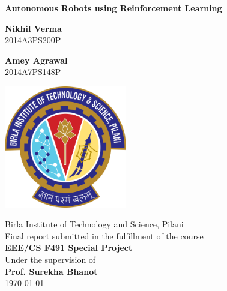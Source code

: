 \documentclass[12pt]{extreport}
\theoremstyle{plain}
\theoremstyle{definition}
\begin{document}
\begin{titlepage}
 \begin{center}

  \vspace*{1cm}

  \begin{huge}
   \textbf{Autonomous Robots using Reinforcement Learning}
  \end{huge}

  \vspace{0.5cm}

  \begin{multicols}{2}
   \textbf{Nikhil Verma}\\
   2014A3PS200P

   \textbf{Amey Agrawal}\\
   2014A7PS148P
  \end{multicols}

  \vspace{2cm}

  \includegraphics[width=0.4\textwidth]{logo}

  \vspace{2cm}

  Birla Institute of Technology and Science, Pilani\\
  \vspace{0.5cm}
  Final report submitted in the fulfillment of the course\\
  \textbf{EEE/CS F491 Special Project}\\
  Under the supervision of\\
  \textbf{Prof. Surekha Bhanot}\\
  \vspace{0.5cm}
  \today


 \end{center}
\end{titlepage}
\end{document}
